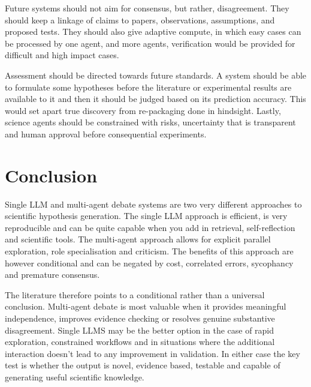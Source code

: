 \documentclass[acmsmall,screen,review]{acmart}
\begin{document}
Future systems should not aim for consensus, but rather, disagreement. They should keep a linkage of claims to papers, observations, assumptions, and proposed tests. They should also give adaptive compute, in which easy cases can be processed by one agent, and more agents, verification would be provided for difficult and high impact cases.

Assessment should be directed towards future standards. A system should be able to formulate some hypotheses before the literature or experimental results are available to it and then it should be judged based on its prediction accuracy. This would set apart true discovery from re-packaging done in hindsight. Lastly, science agents should be constrained with risks, uncertainty that is transparent and human approval before consequential experiments.


\section{Conclusion}
\label{sec:conclusion}

Single LLM and multi-agent debate systems are two very different approaches to scientific hypothesis generation. The single LLM approach is efficient, is very reproducible and can be quite capable when you add in retrieval, self-reflection and scientific tools. The multi-agent approach allows for explicit parallel exploration, role specialisation and criticism. The benefits of this approach are however conditional and can be negated by cost, correlated errors, sycophancy and premature consensus.

The literature therefore points to a conditional rather than a universal conclusion. Multi-agent debate is most valuable when it provides meaningful independence, improves evidence checking or resolves genuine substantive disagreement. Single LLMS may be the better option in the case of rapid exploration, constrained workflows and in situations where the additional interaction doesn't lead to any improvement in validation. In either case the key test is whether the output is novel, evidence based, testable and capable of generating useful scientific knowledge.

\nocite{*}


\end{document}
